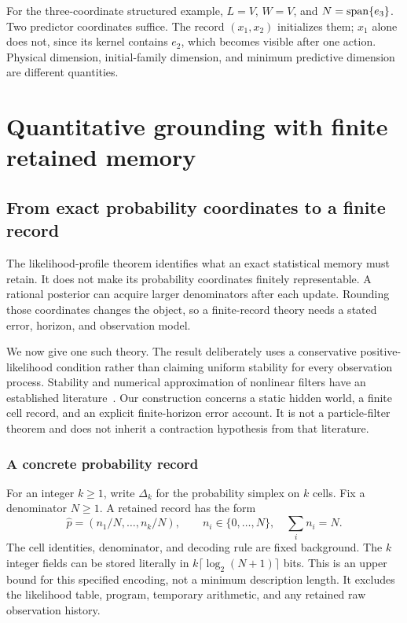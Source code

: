 For the three-coordinate structured example, $L=V$, $W=V$, and $N=\operatorname{span}\{e_3\}$. Two predictor coordinates suffice. The record $(x_1,x_2)$ initializes them; $x_1$ alone does not, since its kernel contains $e_2$, which becomes visible after one action. Physical dimension, initial-family dimension, and minimum predictive dimension are different quantities.

\FloatBarrier
\chapter{Quantitative grounding with finite retained memory}\label{GA:book:chapter-29}

\section{From exact probability coordinates to a finite record}\label{GA:sec:quantized}
The likelihood-profile theorem identifies what an exact statistical memory must retain. It does not make its probability coordinates finitely representable. A rational posterior can acquire larger denominators after each update. Rounding those coordinates changes the object, so a finite-record theory needs a stated error, horizon, and observation model.

We now give one such theory. The result deliberately uses a conservative positive-likelihood condition rather than claiming uniform stability for every observation process. Stability and numerical approximation of nonlinear filters have an established literature~\cite{GA:legland}. Our construction concerns a static hidden world, a finite cell record, and an explicit finite-horizon error account. It is not a particle-filter theorem and does not inherit a contraction hypothesis from that literature.

\subsection{A concrete probability record}
For an integer $k\ge1$, write $\Delta_k$ for the probability simplex on $k$ cells. Fix a denominator $N\ge1$. A retained record has the form
\[
 \widehat p=(n_1/N,\ldots,n_k/N),\qquad n_i\in\{0,\ldots,N\},\quad \sum_i n_i=N.
\]
The cell identities, denominator, and decoding rule are fixed background. The $k$ integer fields can be stored literally in $k\lceil\log_2(N+1)\rceil$ bits. This is an upper bound for this specified encoding, not a minimum description length. It excludes the likelihood table, program, temporary arithmetic, and any retained raw observation history.

